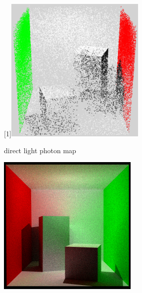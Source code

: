 \documentclass[a4paper, twocolumn]{article}
\begin{document}
    \vspace{0.5em}

    \begin{figure}[ht]
        \centering
        \begin{subfigure}{0.478\linewidth}
            \centering
            \label{fig:cornell_box_photon_map}
            \scalebox{-1}[1]{\includegraphics[width=\linewidth]{share/photon_mapping.png}}
            \caption{direct light photon map}
        \end{subfigure} \hfill
        \begin{subfigure}{0.498\linewidth}
            \centering
            \includegraphics[width=\linewidth]{share/cornell_global_illumination.png}

\end{subfigure}
\end{figure}
\end{document}
